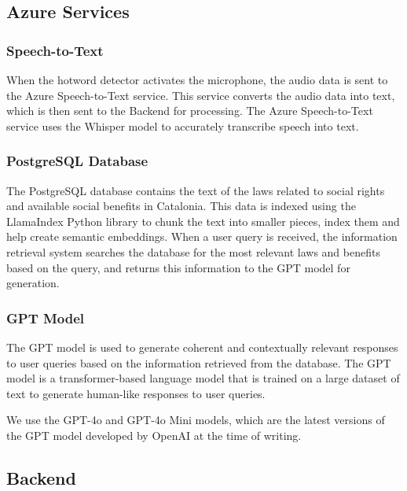 \documentclass[a4paper,12pt,twoside]{ThesisStyle}
\begin{document}
\subsection{Azure Services}
\label{subsec:azure_services}

\subsubsection{Speech-to-Text}

When the hotword detector activates the microphone, the audio data is sent to the Azure Speech-to-Text service. This service converts the audio data into text, which is then sent to the Backend for processing. The Azure Speech-to-Text service uses the Whisper \cite{Radford2022RobustSpeechRecognitionLargeScale} model to accurately transcribe speech into text.

\subsubsection{PostgreSQL Database}
\label{subsubsec:database}

The PostgreSQL database contains the text of the laws related to social rights and available social benefits in Catalonia. This data is indexed using the LlamaIndex Python library to chunk the text into smaller pieces, index them and  help create semantic embeddings. When a user query is received, the information retrieval system searches the database for the most relevant laws and benefits based on the query, and returns this information to the GPT model for generation.

\subsubsection{GPT Model}

The GPT model is used to generate coherent and contextually relevant responses to user queries based on the information retrieved from the database. The GPT model is a transformer-based \cite{Vaswani2023AttentionNeed} language model that is trained on a large dataset of text to generate human-like responses to user queries.

We use the GPT-4o and GPT-4o Mini models, which are the latest versions of the GPT model developed by OpenAI at the time of writing.

\subsection{Backend}
\end{document}
